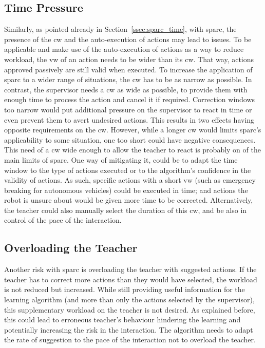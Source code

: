 \subsection{Time Pressure}
Similarly, as pointed already in Section~\ref{ssec:sparc_time}, with \gls{sparc}, the presence of the \gls{cw} and the auto-execution of actions may lead to issues. To be applicable and make use of the auto-execution of actions as a way to reduce workload, the \gls{vw} of an action needs to be wider than its \gls{cw}. That way, actions approved passively are still valid when executed. To increase the application of \gls{sparc} to a wider range of situations, the \gls{cw} has to be as narrow as possible. In contrast, the supervisor needs a \gls{cw} as wide as possible, to provide them with enough time to process the action and cancel it if required. Correction windows too narrow would put additional pressure on the supervisor to react in time or even prevent them to avert undesired actions. %
This results in two effects having opposite requirements on the \gls{cw}. However, while a longer \gls{cw} would limits \gls{sparc}'s applicability to some situation, one too short could have negative consequences. This need of a \gls{cw} wide enough to allow the teacher to react is probably on of the main limits of \gls{sparc}. One way of mitigating it, could be to adapt the time window to the type of actions executed or to the algorithm's confidence in the validity of actions. As such, specific actions with a short \gls{vw} (such as emergency breaking for autonomous vehicles) could be executed in time; and actions the robot is unsure about would be given more time to be corrected. Alternatively, the teacher could also manually select the duration of this \gls{cw}, and be also in control of the pace of the interaction.

\subsection{Overloading the Teacher}
Another risk with \gls{sparc} is overloading the teacher with suggested actions. If the teacher has to correct more actions than they would have selected, the workload is not reduced but increased. While still providing useful information for the learning algorithm (and more than only the actions selected by the supervisor), this supplementary workload on the teacher is not desired. As explained before, this could lead to erroneous teacher's behaviour hindering the learning and potentially increasing the risk in the interaction. The algorithm needs to adapt the rate of suggestion to the pace of the interaction not to overload the teacher.

